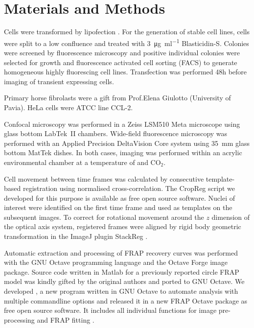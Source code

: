 \section{Materials and Methods}

  Cells were transformed by lipofection .
  For the generation of stable cell lines,
  cells were split to a low confluence and treated
  with \SI{3}{\ug\per\ml} Blasticidin-S.
  Colonies were screened by fluorescence microscopy
  and positive individual colonies were selected for growth
  and fluorescence activated cell sorting (FACS) to generate
  homogeneous highly fluorescing cell lines.
  Transfection was performed 48h before imaging of
  transient expressing cells.

  Primary horse fibrolasts were a gift from Prof.\@ Elena Giulotto
  (University of Pavia). HeLa cells were ATCC line CCL-2.

  Confocal microscopy was performed in a Zeiss LSM510 Meta microscope
  using glass bottom LabTek~II chambers.  Wide-field fluorescence
  microscopy was performed with an Applied Precision DeltaVision Core
  system using \SI{35}{\mm} glass bottom MatTek dishes.  In both
  cases, imaging was performed within an acrylic environmental chamber
  at a temperature of  and  CO$_2$.


  Cell movement between time frames was calculated by consecutive
  template-based registration using normalised cross-correlation.
  The CropReg script we developed for this purpose is available 
  as free open source software. Nuclei of interest were identified 
  on the first time frame and used as templates on the subsequent images.
  To correct for rotational movement
  around the $z$ dimension of the optical axis system,
  registered frames were aligned by rigid body geometric transformation
  in the ImageJ \citep{imagej1} plugin StackReg \citep{stackreg}.

  Automatic extraction and processing of FRAP recovery curves was
  performed with the GNU Octave programming language \citep{octave}
  and the Octave Forge image package.  Source code written in Matlab
  for a previously reported circle FRAP model \citep{mcnally-frap-code}
  was kindly gifted by the original authors and ported to GNU Octave.
  We developed , a new program written in GNU Octave 
  to automate analysis with multiple commandline options
  and released it in a new FRAP Octave package as free open source software.
  It includes all individual functions for image
  pre-processing and FRAP fitting .
